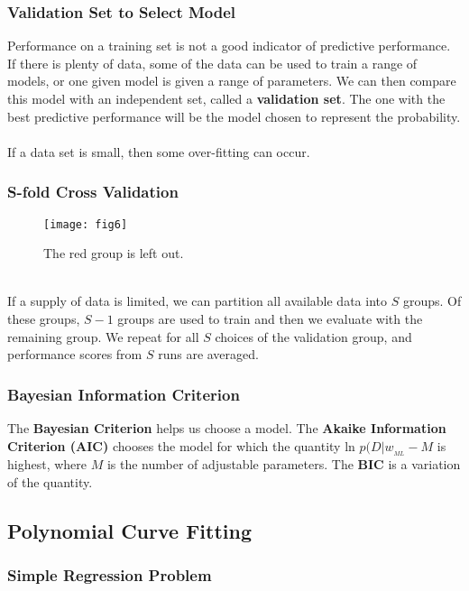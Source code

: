\documentclass[11pt]{article} %
\begin{document}
\subsubsection{Validation Set to Select Model}

Performance on a training set is not a good indicator of predictive performance. If there is plenty of data, some of the data can be used to train a range of models, or one given model is given a range of parameters. We can then compare this model with an independent set, called a {\bf validation set}. The one with the best predictive performance will be the model chosen to represent the probability.\\
~\\
If a data set is small, then some over-fitting can occur.

\subsubsection{S-fold Cross Validation}
\begin{wrapfigure}{r}{0.2\textwidth}
	\centering
		\texttt{[image: fig6]}
	\caption{The red group is left out.}
\end{wrapfigure}
		
~\\

\noindent If a supply of data is limited, we can partition all available data into $S$ groups. Of these groups, $S-1$ groups are used to train and then we evaluate with the remaining group. We repeat for all $S$ choices of the validation group, and performance scores from $S$ runs are averaged.

\subsubsection{Bayesian Information Criterion}

The {\bf Bayesian Criterion} helps us choose a model. The {\bf Akaike Information Criterion (AIC)} chooses the model  for which the quantity ln $p(D|w_{_{ML}}-M$ is highest, where $M$ is the number of adjustable parameters. The {\bf BIC} is a variation of the quantity.

\subsection{Polynomial Curve Fitting}

\subsubsection{Simple Regression Problem}
\end{document}
